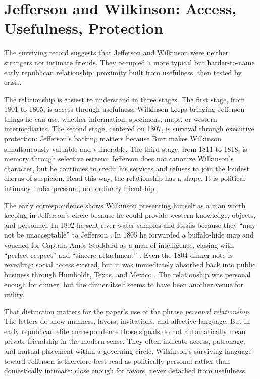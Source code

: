 \section{Jefferson and Wilkinson: Access, Usefulness, Protection}

The surviving record suggests that Jefferson and Wilkinson were neither strangers nor intimate friends. They occupied a more typical but harder-to-name early republican relationship: proximity built from usefulness, then tested by crisis.

The relationship is easiest to understand in three stages. The first stage, from 1801 to 1805, is access through usefulness: Wilkinson keeps bringing Jefferson things he can use, whether information, specimens, maps, or western intermediaries. The second stage, centered on 1807, is survival through executive protection: Jefferson's backing matters because Burr makes Wilkinson simultaneously valuable and vulnerable. The third stage, from 1811 to 1818, is memory through selective esteem: Jefferson does not canonize Wilkinson's character, but he continues to credit his services and refuses to join the loudest chorus of suspicion. Read this way, the relationship has a shape. It is political intimacy under pressure, not ordinary friendship.

The early correspondence shows Wilkinson presenting himself as a man worth keeping in Jefferson's circle because he could provide western knowledge, objects, and personnel. In 1802 he sent river-water samples and fossils because they ``may not be unacceptable'' to Jefferson \citep{wilkinson1802}. In 1805 he forwarded a buffalo-hide map and vouched for Captain Amos Stoddard as a man of intelligence, closing with ``perfect respect'' and ``sincere attachment'' \citep{wilkinson1805}. Even the 1804 dinner note is revealing: social access existed, but it was immediately absorbed back into public business through Humboldt, Texas, and Mexico \citep{wilkinson1804jefferson}. The relationship was personal enough for dinner, but the dinner itself seems to have been another venue for utility.

That distinction matters for the paper's use of the phrase \emph{personal relationship}. The letters do show manners, favors, invitations, and affective language. But in early republican elite correspondence those signals do not automatically mean private friendship in the modern sense. They often indicate access, patronage, and mutual placement within a governing circle. Wilkinson's surviving language toward Jefferson is therefore best read as politically personal rather than domestically intimate: close enough for favors, never detached from usefulness.

